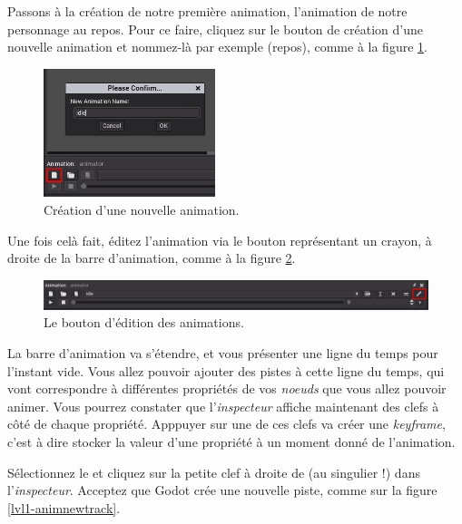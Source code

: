 Passons à la création de notre première animation, l'animation de notre personnage au repos. Pour ce faire, cliquez sur le bouton de création d'une nouvelle animation et nommez-là par exemple  (repos), comme à la figure \ref{lvl1-createidle}.

\begin{figure}
  \begin{center}
    \includegraphics[width=5cm]{img/lvl1-createidle.png}
  \end{center}
  \caption{\label{lvl1-createidle} Création d'une nouvelle animation.}
\end{figure}

Une fois celà fait, éditez l'animation via le bouton représentant un crayon, à droite de la barre d'animation, comme à la figure \ref{lvl1-animeditbutton}.

\begin{figure}
  \begin{center}
    \includegraphics[width=12cm]{img/lvl1-animeditbutton.png}
  \end{center}
  \caption{\label{lvl1-animeditbutton} Le bouton d'édition des animations.}
\end{figure}

La barre d'animation va s'étendre, et vous présenter une ligne du temps pour l'instant vide. Vous allez pouvoir ajouter des pistes à cette ligne du temps, qui vont correspondre à différentes propriétés de vos \emph{noeuds} que vous allez pouvoir animer. Vous pourrez constater que l'\emph{inspecteur} affiche maintenant des clefs à côté de chaque propriété. Apppuyer sur une de ces clefs va créer une \emph{keyframe}, c'est à dire stocker la valeur d'une propriété à un moment donné de l'animation.

Sélectionnez le  et cliquez sur la petite clef à droite de  (au singulier !) dans l'\emph{inspecteur}. Acceptez que Godot crée une nouvelle piste, comme sur la figure \ref{lvl1-animnewtrack}.


